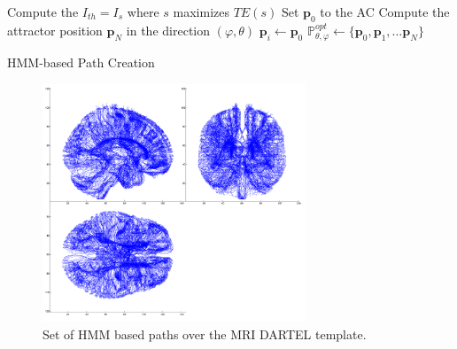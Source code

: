 \begin{algorithm*}
	\BlankLine
	Compute the $I_{th} = I_s$ where $s$ maximizes $TE(s)$\;
	Set $\mathbf{p}_0$ to the AC\;
	Compute the attractor position $\mathbf{p}_N$ in the direction $(\varphi, \theta)$\;
	$\mathbf{p}_i \leftarrow \mathbf{p}_0$\;
	$\mathbb{P}_{\theta,\varphi}^{opt}\leftarrow \{\mathbf{p}_0, \mathbf{p}_1, \dots \mathbf{p}_N\}$\; 
	
	\caption[\acs{HMM}-based Path Creation]{\ac{HMM}-based Path Creation}\label{alg:hmmPath}
\end{algorithm*}\DecMargin{1em}


\begin{figure}
	\begin{center}
		\includegraphics[width=0.7\textwidth]{Graphics/ch6/cuts}
		\caption[Set of \acs{HMM} based paths over the MRI DARTEL template.]{Set of \ac{HMM} based paths over the MRI DARTEL template.}
		\label{fig:cuts}
	\end{center}
\end{figure}


